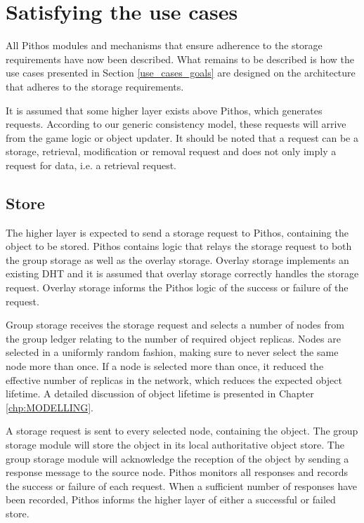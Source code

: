 \section{Satisfying the use cases}
All Pithos modules and mechanisms that ensure adherence to the storage requirements have now been described. What remains to be described is how the use cases presented in Section \ref{use_cases_goals} are designed on the architecture that adheres to the storage requirements.

It is assumed that some higher layer exists above Pithos, which generates requests. According to our generic consistency model, these requests will arrive from the game logic or object updater. It should be noted that a request can be a storage, retrieval, modification or removal request and does not only imply a request for data, i.e. a retrieval request.

\subsection{Store}
\label{pithos_store}

The higher layer is expected to send a storage request to Pithos, containing the object to be stored. Pithos contains logic that relays the storage request to both the group storage as well as the overlay storage. Overlay storage implements an existing DHT and it is assumed that overlay storage correctly handles the storage request. Overlay storage informs the Pithos logic of the success or failure of the request.

Group storage receives the storage request and selects a number of nodes from the group ledger relating to the number of required object replicas. Nodes are selected in a uniformly random fashion, making sure to never select the same node more than once. If a node is selected more than once, it reduced the effective number of replicas in the network, which reduces the expected object lifetime. A detailed discussion of object lifetime is presented in Chapter \ref{chp:MODELLING}.

A storage request is sent to every selected node, containing the object. The group storage module will store the object in its local authoritative object store. The group storage module will acknowledge the reception of the object by sending a response message to the source node. Pithos monitors all responses and records the success or failure of each request. When a sufficient number of responses have been recorded, Pithos informs the higher layer of either a successful or failed store.

